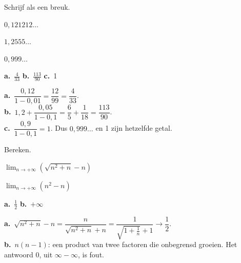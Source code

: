 \begin{oefeningen}
\begin{oefening}[2]
Schrijf als een breuk.
\begin{reeks}
  \item $0{,}121212\ldots$
  \item $1{,}2555\ldots$
  \item $0{,}999\ldots$
\end{reeks}
\begin{solution}
\textbf{a.}~$\tfrac{4}{33}$ \quad \textbf{b.}~$\tfrac{113}{90}$ \quad \textbf{c.}~1
\end{solution}
\begin{fullsolution}
\textbf{a.}~$\dfrac{0{,}12}{1-0{,}01}=\dfrac{12}{99}=\dfrac{4}{33}$.\\
\textbf{b.}~$1{,}2+\dfrac{0{,}05}{1-0{,}1}=\dfrac65+\dfrac{1}{18}=\dfrac{113}{90}$.\\
\textbf{c.}~$\dfrac{0{,}9}{1-0{,}1}=1$. Dus $0{,}999\ldots$ en 1 zijn hetzelfde getal.
\end{fullsolution}
\end{oefening}

\begin{oefening}[2]
Bereken.
\begin{reeks}[2]
  \item $\displaystyle\lim_{n\to+\infty} \left(\sqrt{n^2 + n} - n\right)$
  \item $\displaystyle\lim_{n\to+\infty} \left(n^2 - n\right)$
\end{reeks}
\begin{solution}
\textbf{a.}~$\tfrac12$ \quad \textbf{b.}~$+\infty$
\end{solution}
\begin{fullsolution}
\textbf{a.}~$\sqrt{n^2+n}-n=\dfrac{n}{\sqrt{n^2+n}+n}=\dfrac{1}{\sqrt{1+\tfrac1n}+1}\to\dfrac12$.\\
\textbf{b.}~$n(n-1)$: een product van twee factoren die onbegrensd groeien. Het antwoord 0, uit $\infty-\infty$, is fout.
\end{fullsolution}
\end{oefening}


\end{oefeningen}
